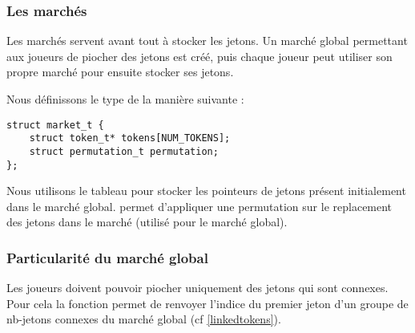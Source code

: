 

\subsubsection{Les marchés}
\label{market}


Les marchés servent avant tout à stocker les jetons. Un marché global permettant aux joueurs de piocher des jetons est créé, puis chaque joueur peut utiliser son propre marché pour ensuite stocker ses jetons.


Nous définissons le type  de la manière suivante : 


\begin{lstlisting}[frame=single, caption={implémentation du type struct market\_t}]
struct market_t {
	struct token_t* tokens[NUM_TOKENS];
	struct permutation_t permutation;
};
\end{lstlisting}


Nous utilisons le tableau  pour stocker les pointeurs de jetons présent initialement dans le marché global.  permet d'appliquer une permutation sur le replacement des jetons dans le marché (utilisé pour le marché global).


\subsubsection*{Particularité du marché global}


Les joueurs doivent pouvoir piocher uniquement des jetons qui sont connexes. Pour cela la fonction  permet de renvoyer l'indice du premier jeton d'un groupe de nb-jetons connexes du marché global (cf \ref{linkedtokens}). 